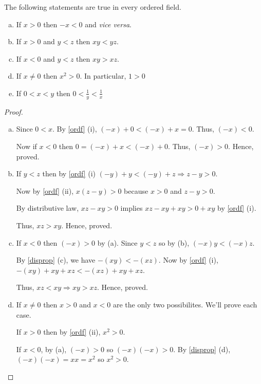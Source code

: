 \begin{prop}
    \label{ordfprop}
    The following statements are true in every ordered field.
    \begin{enumerate}[a)]
        \item If $x > 0$ then $ -x < 0$ and {\it vice versa}.
        \item If $x > 0$ and $y < z$ then $xy < yz$.
        \item If $x < 0$ and $y < z$ then $xy > xz$.
        \item If $x \neq 0$ then $x^2 > 0$. In particular, $1 > 0$
        \item If $0 < x < y$ then $0 < \frac{1}{y} < \frac{1}{x} $
    \end{enumerate}
\end{prop}

\begin{proof}
    \begin{enumerate}[a)]
        \item Since $0 < x$. By \ref{ordf} (i), $(-x) + 0 < (-x) + x = 0$. Thus, $(-x) < 0$.

        Now if $x < 0$ then $0 = (-x) + x < (-x) + 0$. Thus, $(-x) > 0$.
        Hence, proved.

        \item If $y < z$ then by \ref{ordf} (i) $(-y) + y < (-y) + z \Rightarrow z - y > 0$.
        
        Now by \ref{ordf} (ii), $x(z - y) > 0$ because $x > 0$ and $z - y > 0$.
        
        By distributive law, $xz - xy > 0$ implies $xz - xy + xy > 0 + xy$ by \ref{ordf} (i).
        
        Thus, $xz  > xy$. Hence, proved.

        \item If $x < 0$ then $(-x) > 0$ by (a). 
        Since $y < z$ so by (b), $(-x)y < (-x)z$. 

        By \ref{disprop} (c), we have $-(xy) < -(xz)$.
        Now by \ref{ordf} (i), $-(xy) + xy + xz < -(xz) + xy + xz$.
        
        Thus, $xz < xy \Rightarrow xy > xz$. Hence, proved.

        \item If $x \neq 0$ then $x > 0$ and $x < 0$ are the only two possibilites.
        We'll prove each case.
        
        If $x > 0$ then by \ref{ordf} (ii), $x^2 > 0$.

        If $x < 0$, by (a), $(-x) > 0$ so $(-x)(-x) > 0$. 
        By \ref{disprop} (d), $(-x)(-x) = xx = x^2$ so $x^2 > 0$.
        

\end{enumerate}
\end{proof}
